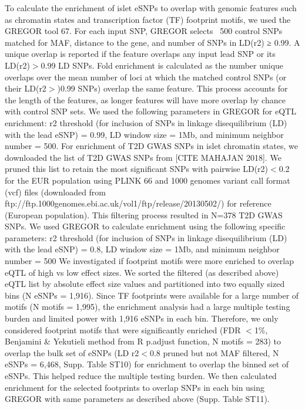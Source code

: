 To calculate the enrichment of islet eSNPs to overlap with genomic features such as chromatin states and transcription factor (TF) footprint motifs, we used the GREGOR tool 67. For each input SNP, GREGOR selects ~500 control SNPs matched for MAF, distance to the gene, and number of SNPs in LD(r2) ≥ 0.99. A unique overlap is reported if the feature overlaps any input lead SNP or its LD(r2)$>$0.99 LD SNPs. Fold enrichment is calculated as the number unique overlaps over the mean number of loci at which the matched control SNPs (or their LD(r2$>$)0.99 SNPs) overlap the same feature. This process accounts for the length of the features, as longer features will have more overlap by chance with control SNP sets. We used the following parameters in GREGOR for eQTL enrichment: r2 threshold (for inclusion of SNPs in linkage disequilibrium (LD) with the lead eSNP) = 0.99, LD window size = 1Mb, and minimum neighbor number = 500.
For enrichment of T2D GWAS SNPs in islet chromatin states, we downloaded the list of T2D GWAS  SNPs from [CITE MAHAJAN 2018]. We pruned this list to retain the most significant SNPs with pairwise LD(r2)$<$0.2 for the EUR population using PLINK 66 and 1000 genomes variant call format (vcf) files (downloaded from ftp://ftp.1000genomes.ebi.ac.uk/vol1/ftp/release/20130502/) for reference (European population). This filtering process resulted in N=378 T2D GWAS SNPs. We used GREGOR to calculate enrichment using the following specific parameters: r2 threshold (for inclusion of SNPs in linkage disequilibrium (LD) with the lead eSNP) = 0.8, LD window size = 1Mb, and minimum neighbor number = 500
We investigated if footprint motifs were more enriched to overlap eQTL of high vs low effect sizes. We sorted the filtered (as described above) eQTL list by absolute effect size values and partitioned into two equally sized bins (N eSNPs = 1,916). Since TF footprints were available for a large number of motifs (N motifs = 1,995), the enrichment analysis had a large multiple testing burden and limited power with 1,916 eSNPs in each bin. Therefore, we only considered footprint motifs that were significantly enriched (FDR $<$1\%, Benjamini \& Yekutieli method from R p.adjust function, N motifs = 283) to overlap the bulk set of eSNPs (LD r2$<$0.8 pruned but not MAF filtered, N eSNPs = 6,468, Supp. Table ST10) for enrichment to overlap the binned set of eSNPs. This helped reduce the multiple testing burden. We then calculated enrichment for the selected footprints to overlap SNPs in each bin using GREGOR with same parameters as described above (Supp. Table ST11).

